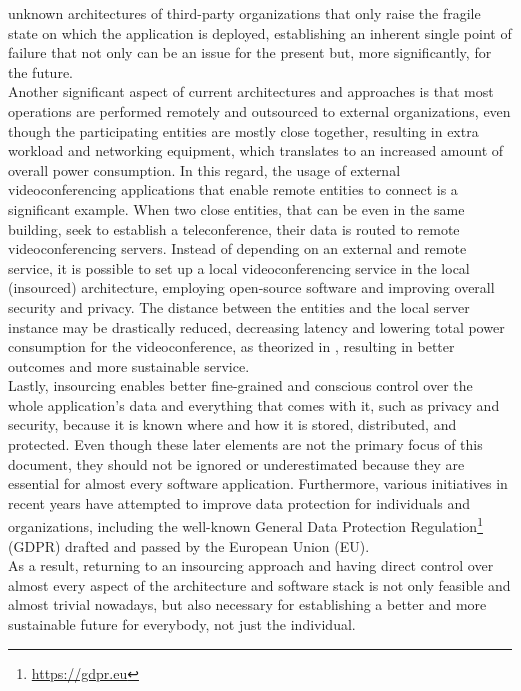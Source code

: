 unknown architectures of third-party organizations that only raise the fragile
state on which the application is deployed, establishing an inherent single point
of failure that not only can be an issue for the present but, more significantly,
for the future. \\ %
Another significant aspect of current architectures and approaches is that most operations
are performed remotely and outsourced to external organizations, even though the
participating entities are mostly close together, resulting in extra workload and
networking equipment, which translates to an increased amount of overall power
consumption. In this regard, the usage of external videoconferencing
applications that enable remote entities to connect is a significant example. When
two close entities, that can be even in the same building, seek to establish a teleconference,
their data is routed to remote videoconferencing servers. Instead of depending on
an external and remote service, it is possible to set up a local
videoconferencing service in the local (insourced) architecture, employing open-source
software and improving overall security and privacy. The distance between the
entities and the local server instance may be drastically reduced, decreasing latency
and lowering total power consumption for the videoconference, as theorized in
\cite{comparison_energy_carbon_time_videoconferencing}, resulting in better outcomes
and more sustainable service. \\ %
Lastly, insourcing enables better fine-grained and conscious control over the
whole application's data and everything that comes with it, such as privacy and security,
because it is known where and how it is stored, distributed, and protected. Even
though these later elements are not the primary focus of this document, they
should not be ignored or underestimated because they are essential for almost
every software application. Furthermore, various initiatives in recent years
have attempted to improve data protection for individuals and organizations, including
the well-known General Data Protection Regulation\footnote{\url{https://gdpr.eu}}
(GDPR) drafted and passed by the European Union (EU). \\ %
As a result, returning to an insourcing approach and having direct control over
almost every aspect of the architecture and software stack is not only feasible
and almost trivial nowadays, but also necessary for establishing a better and more
sustainable future for everybody, not just the individual. \\ %

